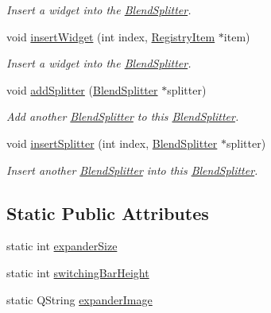 \begin{DoxyCompactItemize}
\begin{DoxyCompactList}\small\item\em Insert a widget into the \hyperlink{class_blend_splitter}{Blend\+Splitter}. \end{DoxyCompactList}\item 
void \hyperlink{class_blend_splitter_a9be82fb24eb94d1b9885cca3488e47e9}{insert\+Widget} (int index, \hyperlink{class_registry_item}{Registry\+Item} $\ast$item)
\begin{DoxyCompactList}\small\item\em Insert a widget into the \hyperlink{class_blend_splitter}{Blend\+Splitter}. \end{DoxyCompactList}\item 
void \hyperlink{class_blend_splitter_abcee5dda4bde4fdb6fda1f3c1f5b9c9a}{add\+Splitter} (\hyperlink{class_blend_splitter}{Blend\+Splitter} $\ast$splitter)
\begin{DoxyCompactList}\small\item\em Add another \hyperlink{class_blend_splitter}{Blend\+Splitter} to this \hyperlink{class_blend_splitter}{Blend\+Splitter}. \end{DoxyCompactList}\item 
void \hyperlink{class_blend_splitter_a5e1adaac62d47cc3815835e713373e2b}{insert\+Splitter} (int index, \hyperlink{class_blend_splitter}{Blend\+Splitter} $\ast$splitter)
\begin{DoxyCompactList}\small\item\em Insert another \hyperlink{class_blend_splitter}{Blend\+Splitter} into this \hyperlink{class_blend_splitter}{Blend\+Splitter}. \end{DoxyCompactList}\end{DoxyCompactItemize}
\subsection*{Static Public Attributes}
\begin{DoxyCompactItemize}
\item 
static int \hyperlink{class_blend_splitter_a233a45efce9417f826d76ce54d832d50}{expander\+Size}
\item 
static int \hyperlink{class_blend_splitter_a478fa3cfcf59f76edf8f021bee297e0d}{switching\+Bar\+Height}
\item 
static Q\+String \hyperlink{class_blend_splitter_a38c7ab0fb471718aca5eb3fe09aa124b}{expander\+Image}
\end{DoxyCompactItemize}


